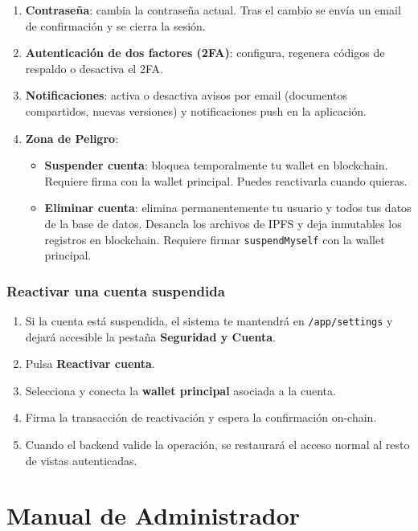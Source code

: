 \documentclass[11pt, a4paper]{article}
\begin{document}
\begin{enumerate}
    \item \textbf{Contraseña}: cambia la contraseña actual. Tras el cambio se envía un email de confirmación y se cierra la sesión.
    \item \textbf{Autenticación de dos factores (2FA)}: configura, regenera códigos de respaldo o desactiva el 2FA.
    \item \textbf{Notificaciones}: activa o desactiva avisos por email (documentos compartidos, nuevas versiones) y notificaciones push en la aplicación.
    \item \textbf{Zona de Peligro}:
    \begin{itemize}
        \item \textbf{Suspender cuenta}: bloquea temporalmente tu wallet en blockchain. Requiere firma con la wallet principal. Puedes reactivarla cuando quieras.
        \item \textbf{Eliminar cuenta}: elimina permanentemente tu usuario y todos tus datos de la base de datos. Desancla los archivos de IPFS y deja inmutables los registros en blockchain. Requiere firmar \texttt{suspendMyself} con la wallet principal.
    \end{itemize}
\end{enumerate}

\subsubsection{Reactivar una cuenta suspendida}

\begin{enumerate}
    \item Si la cuenta está suspendida, el sistema te mantendrá en \texttt{/app/settings} y dejará accesible la pestaña \textbf{Seguridad y Cuenta}.
    \item Pulsa \textbf{Reactivar cuenta}.
    \item Selecciona y conecta la \textbf{wallet principal} asociada a la cuenta.
    \item Firma la transacción de reactivación y espera la confirmación on-chain.
    \item Cuando el backend valide la operación, se restaurará el acceso normal al resto de vistas autenticadas.
\end{enumerate}

\section{Manual de Administrador}
\end{document}
